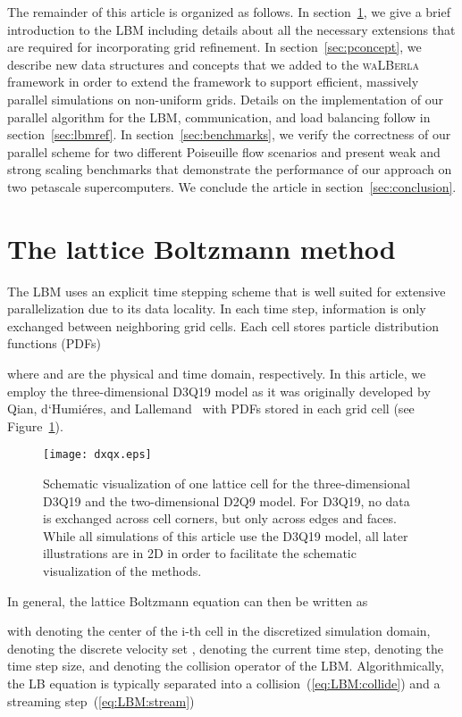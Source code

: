 \documentclass[final,leqno,onefignum,onetabnum]{siamltex1213}
\newcommand{\Walberla}{\textsc{waLBerla}}
\begin{document}
The remainder of this article is organized as follows.
In section~\ref{sec:LBM:general}, we give a brief introduction to the LBM including details about all the necessary extensions that are required for incorporating grid refinement.
In section~\ref{sec:pconcept}, we describe
new data structures and concepts that we added to the \Walberla{} framework in order to extend the framework to
support efficient, massively parallel simulations on non-uniform grids.
Details on the implementation of our parallel algorithm for the LBM, communication, and load balancing follow in section~\ref{sec:lbmref}.
In section~\ref{sec:benchmarks}, we verify the correctness of our parallel scheme for two different Poiseuille flow scenarios and
present weak and strong scaling benchmarks that demonstrate the performance of our approach on two petascale supercomputers.
We conclude the article in section~\ref{sec:conclusion}.

\section{The lattice Boltzmann method}\label{sec:LBM:general}

The LBM uses an explicit time stepping scheme that is well suited for extensive parallelization due to its data locality.
In each time step, information is only exchanged between neighboring grid cells.
Each cell stores  particle distribution functions (PDFs)

where  and  are the physical and time domain, respectively.
In this article, we employ the three-dimensional D3Q19 model as it was originally developed by
Qian, d`Humi\'eres, and Lallemand~\cite{Qian1992} with  PDFs stored in each grid cell (see Figure~\ref{fig:dxqx}).
\begin{figure}[tbp]
  \centering
  \texttt{[image: dxqx.eps]}
  \caption{Schematic visualization of one lattice cell for the three-dimensional D3Q19 and the two-dimensional D2Q9 model.
For D3Q19, no data is exchanged across cell corners, but only across edges and faces.
While all simulations of this article use the D3Q19 model,
all later illustrations are in 2D in order to facilitate the schematic visualization of the methods.}
  \label{fig:dxqx}
\end{figure}
In general, the lattice Boltzmann equation can then be written as

with  denoting the center of the i-th cell in the discretized simulation domain,
 denoting the discrete velocity set ,  denoting the current time step,
 denoting the time step size, and  denoting the collision operator of the LBM.
Algorithmically, the LB equation is typically separated into a collision~(\ref{eq:LBM:collide}) and a streaming step~(\ref{eq:LBM:stream})
\end{document}

